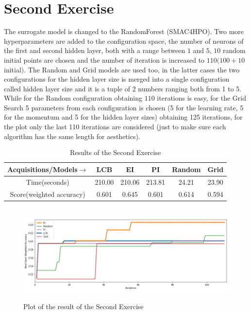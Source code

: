 \documentclass[12pt, onecolumn]{article}
\begin{document}
\section*{Second Exercise}
The surrogate model is changed to the RandomForest (SMAC4HPO).
Two more hyperparameters are added to the configuration space, the number of neurons of the first and second hidden layer, both with a range between $1$ and $5$, $10$ random initial points are chosen and the number of iteration is increased to $110 (100 + 10$ initial$)$.
The Random and Grid models are used too, in the latter cases the two configurations for the hidden layer size is merged into a single configuration called hidden layer size and it is a tuple of 2 numbers ranging both from 1 to 5.
While for the Random configuration obtaining $110$ iterations is easy, for the Grid Search 5 parameters from each configuration is chosen (5 for the learning rate, 5 for the momentum and 5 for the hidden layer sizes) obtaining 125 iterations, for the plot only the last 110 iterations are considered (just to make sure each algorithm has the same length for aesthetics).   
\begin{table}[!h]
  \centering
  \begin{tabular}{ |c|c|c|c|c|c| } 
    \hline
    Acquisitions/Models$\to$ & LCB  & EI & PI & Random & Grid \\
    \hline
    Time(seconds) & 210.00 & 210.06 & 213.81 & 24.21 & 23.90\\
    \hline
    Score(weighted accuracy) & 0.601 & 0.645 & 0.601 & 0.614 & 0.594\\ 
    \hline
  \end{tabular}
  \caption{Results of the Second Exercise}
  \label{tab:Ex2_res}
\end{table}

\begin{figure}[!h]
  \centering
  \includegraphics[width=\linewidth, height=5cm]{imgs/second.png}
  \caption{Plot of the result of the Second Exercise}
  \label{fig:second}
\end{figure}
\end{document}
